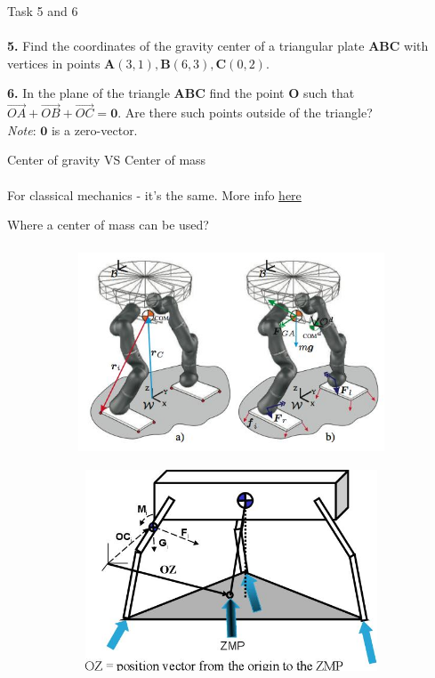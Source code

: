 \documentclass[aspectratio=169,notes]{beamer}
\begin{document}
\begin{frame}[t]{Task 5 and 6}
    \framesubtitle{}
    \textbf{5.} Find the coordinates of the gravity center of a triangular plate $\mathbf{ABC}$ with vertices in points $\mathbf{A}(3,1), \mathbf{B}(6,3), \mathbf{C}(0,2)$. \bigskip

    \textbf{6.} In the plane of the triangle $ \mathbf{ABC}$ find the point $ \mathbf{O}$ such that $\overrightarrow{OA} + \overrightarrow{OB} + \overrightarrow{OC} = \mathbf{0}$. Are there such points outside of the triangle? \\
    \textit{Note}: $ \mathbf{0}$ is a zero-vector. \\
\end{frame}

\begin{frame}[t]{Center of gravity VS Center of mass}
    \framesubtitle{}
    For classical mechanics - it’s the same. More info \href{https://www.youtube.com/watch?v=abUFbZfPzjY}{here}
\end{frame}

\begin{frame}[t]{Where a center of mass can be used?}
    \framesubtitle{}
    \begin{figure}[H]
        \begin{subfigure}{0.49\textwidth}
            \centering\includegraphics[height=6cm,width=1\textwidth,keepaspectratio]{resources/image35.png}
            \label{fig:resources/image35.png}
        \end{subfigure}
        \begin{subfigure}{0.49\textwidth}
            \centering\includegraphics[height=6cm,width=1\textwidth,keepaspectratio]{resources/image36.png}
            \label{fig:resources/image36.png}
        \end{subfigure}
    \end{figure}
\end{frame}
\end{document}
